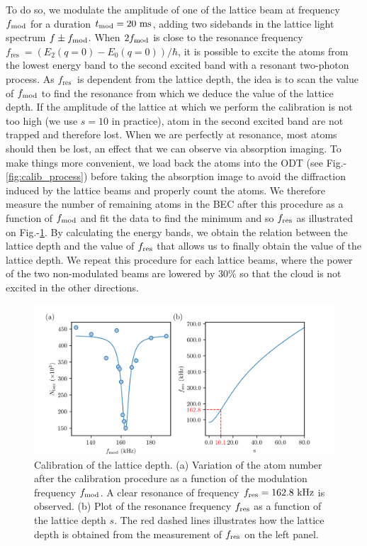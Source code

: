 To do so, we modulate the amplitude of one of the lattice beam at frequency $f_{\rm{mod}}$ for a duration $t_{\rm{mod} }= 20 \ \rm{ms}$, adding two sidebands in the lattice light spectrum $f \pm f_{\rm{mod}}$. When $2 f_{\rm{mod}}$ is close to the resonance frequency $f_{\text {res }}=\left(E_{2}(q=0)-E_{0}(q=0)\right)/\hbar$, it is possible to excite the atoms from the lowest energy band to the second excited band with a resonant two-photon process. As $f_{\text {res }}$ is dependent from the lattice depth, the idea is to scan the value of $f_{\rm{mod}}$ to find the resonance from which we deduce the value of the lattice depth. If the amplitude of the lattice at which we perform the calibration is not too high (we use $s= 10$ in practice), atom in the second excited band are not trapped and therefore lost. When we are perfectly at resonance, most atoms should then be lost, an effect that we can observe via absorption imaging. To make things more convenient, we load back the atoms into the ODT (see Fig.-\ref{fig:calib_process}) before taking the absorption image to avoid the diffraction induced by the lattice beams and properly count the atoms. We therefore measure the number of remaining atoms in the BEC after this procedure as a function of $f_{\rm{mod}}$ and fit the data to find the minimum and so $f_{\rm{res}}$ as illustrated on Fig.-\ref{fig:lattice_calibration}. By calculating the energy bands, we obtain the relation between the lattice depth and the value of $f_{\rm{res}}$ that allows us to finally obtain the value of the lattice depth. We repeat this procedure for each lattice beams, where the power of the two non-modulated beams are lowered by $30 \%$ so that the cloud is not excited in the other directions.

\begin{figure}
    \centering
    \includegraphics[width=\textwidth]{Fig/Chapter3/lattice_calibration.png}
    \caption[Calibration of the lattice depth]{Calibration of the lattice depth. (a) Variation of the atom number after the calibration procedure as a function of the modulation frequency $f_{\rm{mod}}$. A clear resonance of frequency $f_{\rm{res}}=162.8 \ \rm{kHz}$ is observed. (b) Plot of the resonance frequency $f_{\rm{res}}$ as a function of the lattice depth $s$. The red dashed lines illustrates how the lattice depth is obtained from the measurement of $f_{\rm{res}}$ on the left panel.}
    \label{fig:lattice_calibration}
\end{figure}


